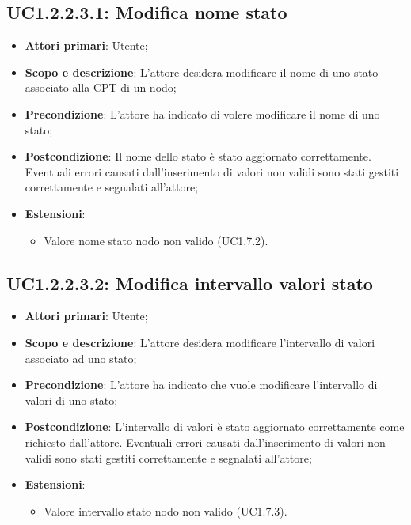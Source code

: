 \subsection{UC1.2.2.3.1: Modifica nome stato} 
\hypertarget{UC1.2.2.3.1}{} 
\begin{itemize} 
	\item{\textbf{Attori primari}: Utente;} 
	\item{\textbf{Scopo e descrizione}: L'attore desidera modificare il nome di uno stato associato alla CPT di un nodo;} 
	\item{\textbf{Precondizione}: L'attore ha indicato di volere modificare il nome di uno stato;} 
	\item{\textbf{Postcondizione}: Il nome dello stato è stato aggiornato correttamente. Eventuali errori causati dall'inserimento di valori non validi sono stati gestiti correttamente e segnalati all'attore;}
	\item{\textbf{Estensioni}:
		\begin{itemize}
			\item{Valore nome stato nodo non valido (UC1.7.2)}.
		\end{itemize}
	}
\end{itemize} 
\subsection{UC1.2.2.3.2: Modifica intervallo valori stato} 
\hypertarget{UC1.2.2.3.2}{} 
\begin{itemize} 
	\item{\textbf{Attori primari}: Utente;} 
	\item{\textbf{Scopo e descrizione}: L'attore desidera modificare l'intervallo di valori associato ad uno stato;} 
	\item{\textbf{Precondizione}: L'attore ha indicato che vuole modificare l'intervallo di valori di uno stato;} 
	\item{\textbf{Postcondizione}: L'intervallo di valori è stato aggiornato correttamente come richiesto dall'attore. Eventuali errori causati dall'inserimento di valori non validi sono stati gestiti correttamente e segnalati all'attore;}
	\item{\textbf{Estensioni}:
		\begin{itemize}
			\item{Valore intervallo stato nodo non valido (UC1.7.3).}
		\end{itemize}
	}
\end{itemize} 
